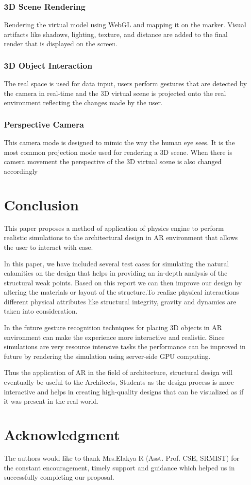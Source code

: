 \documentclass[conference]{IEEEtran}
\begin{document}
\subsubsection{3D Scene Rendering}
Rendering the virtual model using WebGL and mapping it on the marker. Visual artifacts like shadows, lighting, texture, and distance are added to the final render that is displayed on the screen.
\subsubsection{3D Object Interaction}
The real space is used for data input, users perform gestures that are detected by the camera in real-time and the 3D virtual scene is projected onto the real environment reflecting the changes made by the user.

\subsubsection{Perspective Camera}
This camera mode is designed to mimic the way the human eye sees. It is the most common projection mode used for rendering a 3D scene. When there is camera movement the perspective of the 3D virtual scene is also changed accordingly
\section{Conclusion}
This paper proposes a method of application of physics engine to perform realistic simulations to the architectural design in AR environment that allows the user to interact with ease.

In this paper, we have included several test cases for simulating the natural calamities on the design that helps in providing an in-depth analysis of the structural weak points. Based on this report we can then improve our design by altering the materials or layout of the structure.To realize physical interactions different physical attributes like structural integrity, gravity and dynamics are taken into consideration. 

In the future gesture recognition techniques for placing 3D objects in AR environment can make the experience more interactive and realistic.
Since simulations are very resource intensive tasks the performance can be improved in future by rendering the simulation using server-side GPU computing.

Thus the application of AR in the field of architecture, structural design will eventually be useful to the Architects, Students as the design process is more interactive and helps in creating high-quality designs that can be visualized as if it was present in the real world.

\section*{Acknowledgment}
The authors would like to thank Mrs.Elakya R (Asst. Prof. CSE, SRMIST) for the constant encouragement, timely support and guidance which helped us in successfully completing our proposal.




\end{document}
